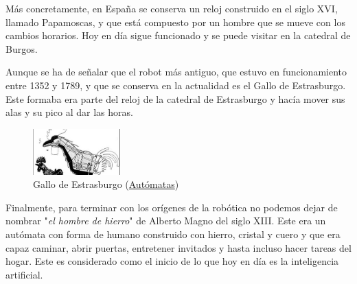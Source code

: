 Más concretamente, en España se conserva un reloj construido en el siglo XVI, llamado Papamoscas,  y que está compuesto por un hombre que se mueve con los cambios horarios. Hoy en día sigue funcionado y se puede visitar en la catedral de Burgos.


Aunque se ha de señalar que el robot más antiguo, que estuvo en funcionamiento entre 1352 y 1789, y que se conserva en la actualidad es el Gallo de Estrasburgo. Este formaba era parte del reloj de la catedral de Estrasburgo y hacía mover sus alas y su pico al dar las horas.

\begin{figure}[H]
\begin{center}
  \includegraphics[width=0.3\textwidth]{./EtapaPrimeriza/imagenes/gallo.jpg}
  \caption{Gallo de Estrasburgo  (\href{http://lasmilrespuestas.blogspot.com/2012/06/como-funcionaban-los-automatas.html} {Autómatas})}
  \label{gallo}
\end{center}
\end{figure}


Finalmente, para terminar con los orígenes de la robótica no podemos dejar de nombrar "\textit{el hombre de hierro}" de Alberto Magno del siglo XIII. Este era un autómata con forma de humano construido con hierro, cristal y cuero y que era capaz caminar, abrir puertas, entretener invitados y hasta incluso hacer tareas del hogar. Este es considerado como el inicio de lo que hoy en día es la inteligencia artificial.
